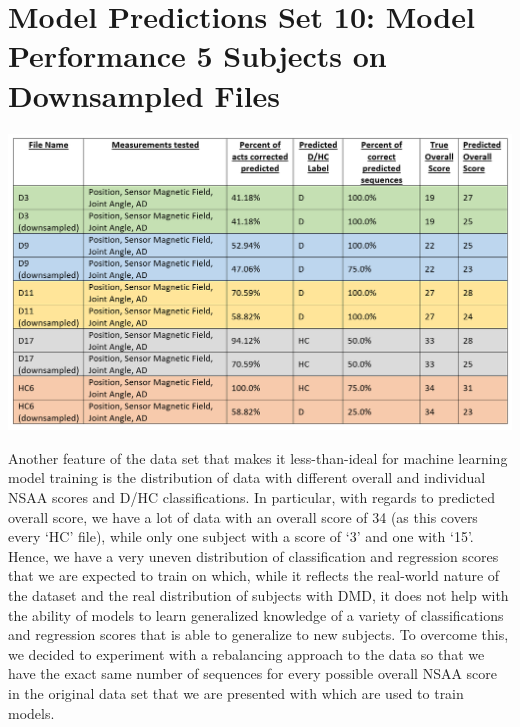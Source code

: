 \documentclass[12pt,twoside]{report}
\begin{document}
\section{Model Predictions Set 10: Model Performance 5 Subjects on Downsampled Files}

\begin{center}
\includegraphics[scale=0.4]{project_figures/fig11_17}
\end{center}

\quad Another feature of the data set that makes it less-than-ideal for machine learning model training is the distribution of data with different overall and individual NSAA scores and D/HC classifications. In particular, with regards to predicted overall score, we have a lot of data with an overall score of 34 (as this covers every ‘HC’ file), while only one subject with a score of ‘3’ and one with ‘15’. Hence, we have a very uneven distribution of classification and regression scores that we are expected to train on which, while it reflects the real-world nature of the dataset and the real distribution of subjects with DMD, it does not help with the ability of models to learn generalized knowledge of a variety of classifications and regression scores that is able to generalize to new subjects. To overcome this, we decided to experiment with a rebalancing approach to the data so that we have the exact same number of sequences for every possible overall NSAA score in the original data set that we are presented  with which are used to train models.\\
\end{document}
